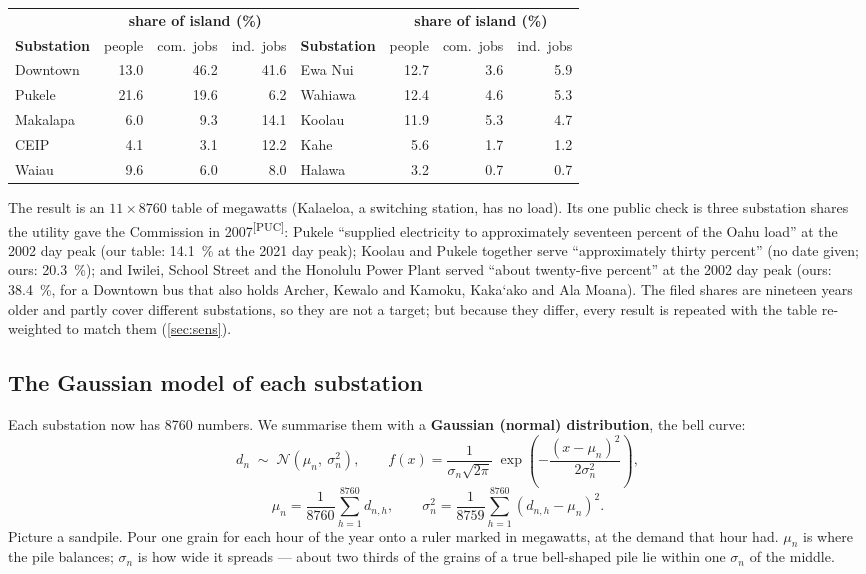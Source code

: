 \documentclass[11pt,a4paper]{article}
\newcommand{\okina}{\textquoteleft}
\newcommand{\src}[1]{\textsuperscript{[#1]}}
\begin{document}
\begin{center}
\small
\begin{tabular}{@{}lrrr@{\hspace{2.2em}}lrrr@{}}
\toprule
& \multicolumn{3}{c}{\textbf{share of island (\%)}} & & \multicolumn{3}{c}{\textbf{share of island (\%)}} \\
\textbf{Substation} & people & com.\ jobs & ind.\ jobs & \textbf{Substation} & people & com.\ jobs & ind.\ jobs \\
\midrule
Downtown & 13.0 & 46.2 & 41.6 & Ewa Nui & 12.7 & 3.6 & 5.9 \\
Pukele   & 21.6 & 19.6 & 6.2  & Wahiawa & 12.4 & 4.6 & 5.3 \\
Makalapa & 6.0  & 9.3  & 14.1 & Koolau  & 11.9 & 5.3 & 4.7 \\
CEIP     & 4.1  & 3.1  & 12.2 & Kahe    & 5.6  & 1.7 & 1.2 \\
Waiau    & 9.6  & 6.0  & 8.0  & Halawa  & 3.2  & 0.7 & 0.7 \\
\bottomrule
\end{tabular}
\end{center}

The result is an $11 \times \num{8760}$ table of megawatts (Kalaeloa, a switching
station, has no load). Its one public check is three substation shares the utility gave the Commission in
2007\src{PUC}: Pukele ``supplied electricity to approximately seventeen percent of the
Oahu load'' at the 2002 day peak (our table: \SI{14.1}{\percent} at the 2021 day peak);
Koolau and Pukele together serve ``approximately thirty percent'' (no date given; ours:
\SI{20.3}{\percent}); and Iwilei, School Street and the Honolulu Power Plant served
``about twenty-five percent'' at the 2002 day peak (ours: \SI{38.4}{\percent}, for a
Downtown bus that also holds Archer, Kewalo and Kamoku, Kaka\okina ako and Ala Moana).
The filed shares are nineteen years older and partly cover different substations, so
they are not a target; but because they differ, every result is repeated with the
table re-weighted to match them (\cref{sec:sens}).

\subsection{The Gaussian model of each substation}

Each substation now has \num{8760} numbers. We summarise them with a
\textbf{Gaussian (normal) distribution}, the bell curve:
\[
  d_n \;\sim\; \mathcal{N}\!\left(\mu_n,\ \sigma_n^{2}\right),
  \qquad
  f(x) = \frac{1}{\sigma_n\sqrt{2\pi}}\;
         \exp\!\left(-\frac{(x-\mu_n)^2}{2\sigma_n^2}\right),
\]
\[
  \mu_n = \frac{1}{8760}\sum_{h=1}^{8760} d_{n,h},
  \qquad
  \sigma_n^{2} = \frac{1}{8759}\sum_{h=1}^{8760}\left(d_{n,h} - \mu_n\right)^{2}.
\]
Picture a sandpile. Pour one grain for each hour of the year onto a ruler marked in
megawatts, at the demand that hour had. $\mu_n$ is where the pile balances; $\sigma_n$
is how wide it spreads --- about two thirds of the grains of a true bell-shaped pile lie
within one $\sigma_n$ of the middle.
\end{document}
